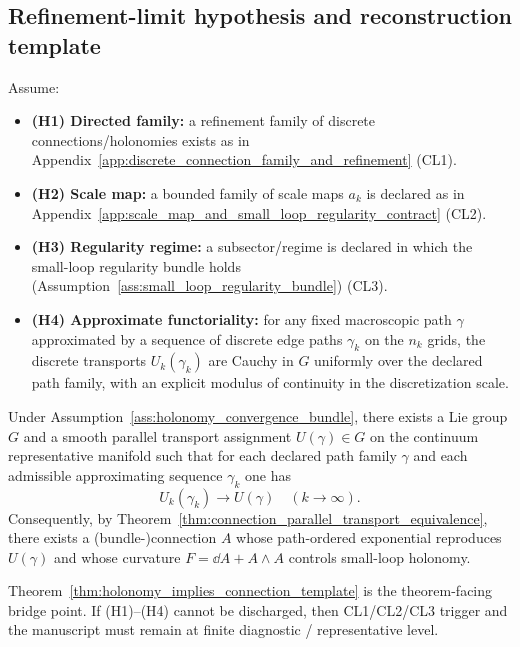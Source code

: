 \subsection{Refinement-limit hypothesis and reconstruction template}
\begin{assumption}
\label{ass:holonomy_convergence_bundle}
\AuditTag Assume:
\begin{itemize}
\item \textbf{(H1) Directed family:} a refinement family of discrete connections/holonomies exists as in Appendix~\ref{app:discrete_connection_family_and_refinement} (CL1).
\item \textbf{(H2) Scale map:} a bounded family of scale maps $a_k$ is declared as in Appendix~\ref{app:scale_map_and_small_loop_regularity_contract} (CL2).
\item \textbf{(H3) Regularity regime:} a subsector/regime is declared in which the small-loop regularity bundle holds (Assumption~\ref{ass:small_loop_regularity_bundle}) (CL3).
\item \textbf{(H4) Approximate functoriality:} for any fixed macroscopic path $\gamma$ approximated by a sequence of discrete edge paths $\gamma_k$ on the $n_k$ grids, the discrete transports $U_k(\gamma_k)$ are Cauchy in $G$ uniformly over the declared path family, with an explicit modulus of continuity in the discretization scale.
\end{itemize}
\end{assumption}

\begin{theorem}
\label{thm:holonomy_implies_connection_template}
\MathTag Under Assumption~\ref{ass:holonomy_convergence_bundle}, there exists a Lie group $G$ and a smooth parallel transport assignment $U(\gamma)\in G$ on the continuum representative manifold such that for each declared path family $\gamma$ and each admissible approximating sequence $\gamma_k$ one has
\[
U_k(\gamma_k)\to U(\gamma)\quad (k\to\infty).
\]
Consequently, by Theorem~\ref{thm:connection_parallel_transport_equivalence}, there exists a (bundle-)connection $A$ whose path-ordered exponential reproduces $U(\gamma)$ and whose curvature $F=\dd A + A\wedge A$ controls small-loop holonomy.
\end{theorem}

\AuditTag Theorem~\ref{thm:holonomy_implies_connection_template} is the theorem-facing bridge point.
If (H1)--(H4) cannot be discharged, then CL1/CL2/CL3 trigger and the manuscript must remain at finite diagnostic / representative level.

